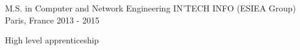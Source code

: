 

\begin{cventries}

  \cventry
    {M.S. in Computer and Network Engineering} %
    {IN'TECH INFO (ESIEA Group)} %
    {Paris, France} %
    {2013 - 2015} %
    {
      \begin{cvitems} %
      \item {High level apprenticeship}
      \end{cvitems}
    }

\end{cventries}
